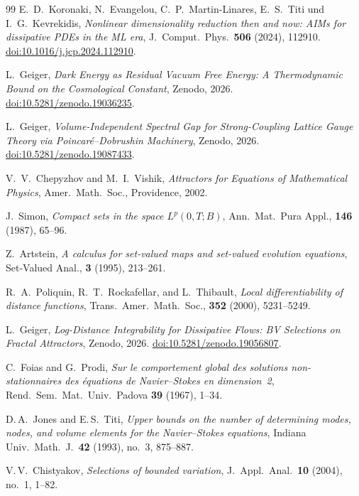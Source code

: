 \documentclass[12pt,a4paper]{article}
\theoremstyle{definition}
\theoremstyle{plain}
\theoremstyle{remark}
\begin{document}
\begin{thebibliography}{99}
E.~D.~Koronaki, N.~Evangelou, C.~P.~Martin-Linares, E.~S.~Titi und I.~G.~Kevrekidis,
\emph{Nonlinear dimensionality reduction then and now: AIMs for dissipative PDEs in the ML era},
J.\ Comput.\ Phys.\ \textbf{506} (2024), 112910.
\href{https://doi.org/10.1016/j.jcp.2024.112910}{doi:10.1016/j.jcp.2024.112910}.

L.~Geiger,
\emph{Dark Energy as Residual Vacuum Free Energy: A Thermodynamic Bound on the Cosmological Constant},
Zenodo, 2026.
\href{https://doi.org/10.5281/zenodo.19036235}{doi:10.5281/zenodo.19036235}.

L.~Geiger,
\emph{Volume-Independent Spectral Gap for Strong-Coupling Lattice Gauge Theory via Poincar\'e--Dobrushin Machinery},
Zenodo, 2026.
\href{https://doi.org/10.5281/zenodo.19087433}{doi:10.5281/zenodo.19087433}.

V.~V.~Chepyzhov and M.~I.~Vishik, \textit{Attractors for Equations of Mathematical Physics}, Amer.\ Math.\ Soc., Providence, 2002.

J.~Simon, \textit{Compact sets in the space $L^p(0,T;B)$}, Ann.\ Mat.\ Pura Appl., \textbf{146} (1987), 65--96.

Z.~Artstein, \textit{A calculus for set-valued maps and set-valued evolution equations}, Set-Valued Anal., \textbf{3} (1995), 213--261.

R.~A.~Poliquin, R.~T.~Rockafellar, and L.~Thibault, \textit{Local differentiability of distance functions}, Trans.\ Amer.\ Math.\ Soc., \textbf{352} (2000), 5231--5249.

 L.~Geiger, \textit{Log-Distance Integrability for Dissipative Flows: BV Selections on Fractal Attractors}, Zenodo, 2026.
\href{https://doi.org/10.5281/zenodo.19056807}{doi:10.5281/zenodo.19056807}.

C.~Foias and G.~Prodi,
\emph{Sur le comportement global des solutions non-stationnaires des \'equations de Navier--Stokes en dimension~2},
Rend.\ Sem.\ Mat.\ Univ.\ Padova \textbf{39} (1967), 1--34.

D.\,A.~Jones and E.\,S.~Titi,
\emph{Upper bounds on the number of determining modes, nodes, and volume elements for the Navier--Stokes equations},
Indiana Univ.\ Math.\ J.\ \textbf{42} (1993), no.~3, 875--887.

V.\,V.~Chistyakov,
\emph{Selections of bounded variation},
J.~Appl.\ Anal.\ \textbf{10} (2004), no.~1, 1--82.


\end{thebibliography}
\end{document}
